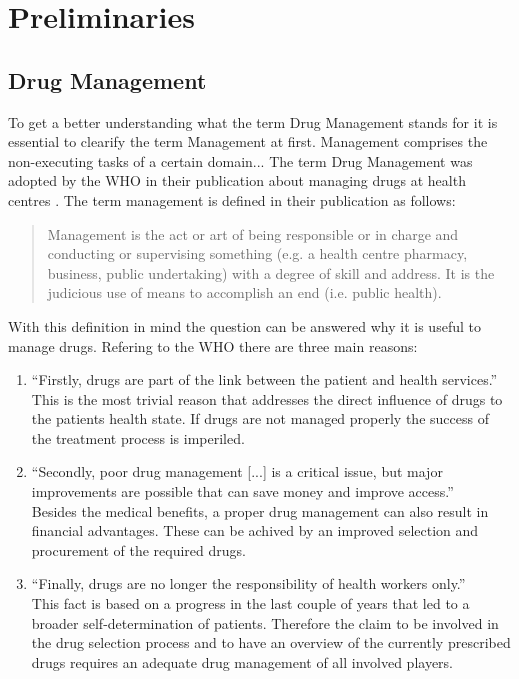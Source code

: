 \chapter{Preliminaries}
\label{cha:prelims}

\section{Drug Management}
\label{sec:drug-management}

To get a better understanding what the term Drug Management stands for it is essential to clearify the term Management at first.
Management comprises the non-executing tasks of a certain domain... \todo{}
The term Drug Management was adopted by the WHO in their publication about managing drugs at health centres \cite{who2004}.
The term management is defined in their publication as follows: 
\begin{quote}
  Management is the act or art of being responsible or in charge and conducting or supervising something (e.g. a health centre pharmacy, business, public undertaking) with a degree of skill and address. It is the judicious use of means to accomplish an end (i.e. public health).
\end{quote}
With this definition in mind the question can be answered why it is useful to manage drugs.
Refering to the WHO there are three main reasons:
\begin{enumerate}
\item ``Firstly, drugs are part of the link between the patient and health services.''\\
  This is the most trivial reason that addresses the direct influence of drugs to the patients health state. If drugs are not managed properly the success of the treatment process is imperiled. 
\item ``Secondly, poor drug management [...] is a critical issue, but major improvements are possible that can save money and improve access.''\\
  Besides the medical benefits, a proper drug management can also result in financial advantages. These can be achived by an improved selection and procurement of the required drugs.
\item ``Finally, drugs are no longer the responsibility of health workers only.''\\
  This fact is based on a progress in the last couple of years that led to a broader self-determination of patients. 
  Therefore the claim to be involved in the drug selection process and to have an overview of the currently prescribed drugs requires an adequate drug management of all involved players.
\end{enumerate}
